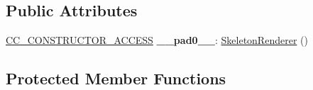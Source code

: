 \subsection*{Public Attributes}
\begin{DoxyCompactItemize}
\item 
\mbox{\label{classspine_1_1SkeletonRenderer_a83682187104e5742e3d555b023fbeb80}} 
\hyperlink{_2cocos2d_2cocos_2base_2ccConfig_8h_a25ef1314f97c35a2ed3d029b0ead6da0}{C\+C\+\_\+\+C\+O\+N\+S\+T\+R\+U\+C\+T\+O\+R\+\_\+\+A\+C\+C\+E\+SS} {\bfseries \+\_\+\+\_\+pad0\+\_\+\+\_\+}\+: \hyperlink{classspine_1_1SkeletonRenderer}{Skeleton\+Renderer} ()
\end{DoxyCompactItemize}
\subsection*{Protected Member Functions}
